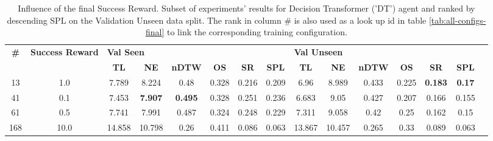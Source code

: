 \begin{table}
\centering
\caption{\label{tab:dt_reward_scale}Influence of the final Success Reward. Subset of experiments' results for Decision Transformer ('DT') agent and ranked by descending SPL on the Validation Unseen data split. The rank in column \# is also used as a look up id in table \ref{tab:all-configs-final} to link the corresponding training configuration.}
\begin{tabular}{@{\hskip3pt}c@{\hskip3pt}c@{\hskip3pt}c@{\hskip3pt}c@{\hskip3pt}c@{\hskip3pt}c@{\hskip3pt}c@{\hskip3pt}c@{\hskip3pt}c@{\hskip3pt}c@{\hskip3pt}c@{\hskip3pt}c@{\hskip3pt}c@{\hskip3pt}c@{\hskip3pt}c}
\toprule
\textbf{\#} & \textbf{Success Reward } & \multicolumn{6}{l}{\textbf{Val Seen}} & \multicolumn{6}{l}{\textbf{Val Unseen}} \\
 \textbf{~} &               \textbf{~} &       \textbf{TL} &     \textbf{NE} &   \textbf{nDTW} & \textbf{OS} & \textbf{SR} & \textbf{SPL} &         \textbf{TL} & \textbf{NE} & \textbf{nDTW} & \textbf{OS} &     \textbf{SR} &   \textbf{SPL} \\
\midrule
         13 &                      1.0 &             7.789 &           8.224 &            0.48 &       0.328 &       0.216 &        0.209 &                6.96 &       8.989 &         0.433 &       0.225 &  \textbf{0.183} &  \textbf{0.17} \\
         41 &                      0.1 &             7.453 &  \textbf{7.907} &  \textbf{0.495} &       0.328 &       0.251 &        0.236 &               6.683 &        9.05 &         0.427 &       0.207 &           0.166 &          0.155 \\
         61 &                      0.5 &             7.741 &           7.991 &           0.487 &       0.324 &       0.248 &        0.229 &               7.311 &       9.058 &          0.42 &        0.25 &           0.162 &           0.15 \\
        168 &                     10.0 &            14.858 &          10.798 &            0.26 &       0.411 &       0.086 &        0.063 &              13.867 &      10.457 &         0.265 &        0.33 &           0.089 &          0.063 \\
\bottomrule
\end{tabular}
\end{table}
